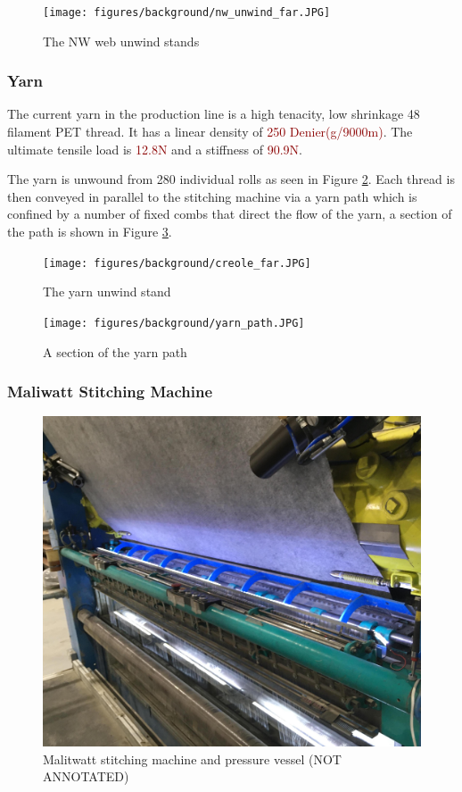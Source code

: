\documentclass[12pt]{report}
\newcommand{\tcr}[1]{\textcolor{darkRed}{#1}}
\begin{document}
\begin{figure}[ht]
    \centering
    \texttt{[image: figures/background/nw\_unwind\_far.JPG]}
    \caption{The NW web unwind stands}
    \label{fig:nw_unwind}
\end{figure}
    

        \subsubsection{Yarn}
        The current yarn in the production line is a high tenacity, low shrinkage 48 filament PET thread. It has a linear density of \tcr{250 Denier(g/9000m)}. The ultimate tensile load is \tcr{12.8N} and a stiffness of \tcr{90.9N}.
        
        The yarn is unwound from 280 individual rolls as seen in Figure \ref{fig:yarn_unwind}. Each thread is then conveyed in parallel to the stitching machine via a yarn path which is confined by a number of fixed combs that direct the flow of the yarn, a section of the path is shown in Figure \ref{fig:yarn_path}.
        
\begin{figure}
    \centering
    \texttt{[image: figures/background/creole\_far.JPG]}
    \caption{The yarn unwind stand}
    \label{fig:yarn_unwind}
\end{figure}
\begin{figure}
    \centering
    \texttt{[image: figures/background/yarn\_path.JPG]}
    \caption{A section of the yarn path}
    \label{fig:yarn_path}
\end{figure}

        \subsubsection{Maliwatt Stitching Machine}
\begin{figure}[ht]
    \centering
    \includegraphics[width=\textwidth]{figures/background/maliwatt_far_crop.jpeg}
    \caption{Malitwatt stitching machine and pressure vessel (NOT ANNOTATED)}
    \label{fig:malitwatt_front}
\end{figure}
\end{document}
